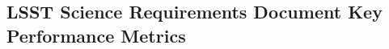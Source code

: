 \documentclass[twocolumn]{aastex62}
\begin{document}


\subsection{LSST Science Requirements Document Key Performance Metrics}
\end{document}
